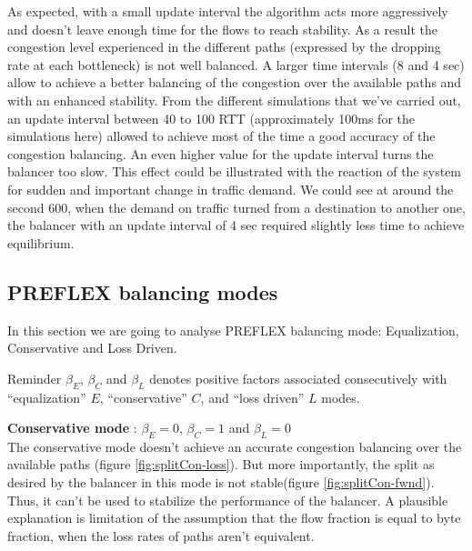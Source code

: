 As expected, with a small update interval the algorithm acts more aggressively and doesn't leave enough time for the flows to reach stability. As a result the congestion level experienced in the different paths (expressed by the dropping rate at each bottleneck) is not well balanced. A larger time intervals (8 and 4 sec) allow to achieve a better balancing of the congestion over the available paths and with an enhanced stability. From the different simulations that we've carried out, an update interval between 40 to 100 RTT (approximately 100ms for the simulations here) allowed to achieve most of the time a good accuracy of the congestion balancing. An even higher value for the update interval turns the balancer too slow. This effect could be illustrated with the reaction of the system for sudden and important change in traffic demand. We could see at around the second 600, when the demand on traffic turned from a destination to another one, the balancer with an update interval of 4 sec required slightly less time to achieve equilibrium.    
 
 \clearpage


\subsection{PREFLEX balancing modes}

In this section we are going to analyse PREFLEX balancing mode: Equalization, Conservative and Loss Driven.

Reminder
$\beta_{E}$, $\beta_{C}$ and $\beta_{L}$ denotes positive factors associated consecutively with “equalization” $E$, “conservative” $C$, and “loss driven” $L$ modes.

{\bf Conservative mode} : $\beta_{E}=0$, $\beta_{C}=1$ and $\beta_{L}=0$
\\The conservative mode doesn't achieve an accurate congestion balancing over the available paths (figure \ref{fig:splitCon-loss}). But more importantly, the split as desired by the balancer in this mode is not stable(figure \ref{fig:splitCon-fwnd}). Thus, it can't be used to stabilize the performance of the balancer. A plausible explanation is limitation of the assumption that the flow fraction is equal to byte fraction, when the loss rates of paths aren't equivalent.

